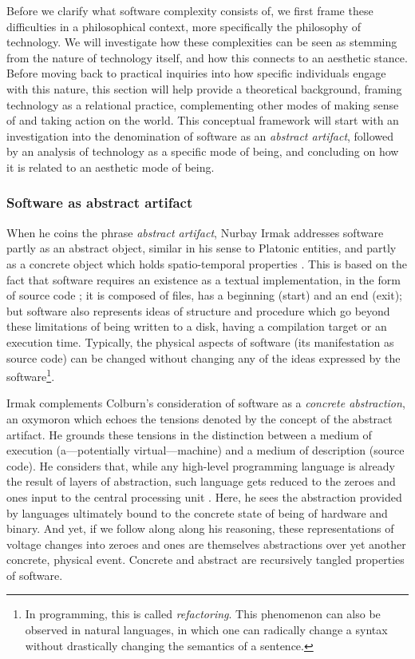 Before we clarify what software complexity consists of, we first frame these difficulties in a philosophical context, more specifically the philosophy of technology. We will investigate how these complexities can be seen as stemming from the nature of technology itself, and how this connects to an aesthetic stance. Before moving back to practical inquiries into how specific individuals engage with this nature, this section will help provide a theoretical background, framing technology as a relational practice, complementing other modes of making sense of and taking action on the world. This conceptual framework will start with an investigation into the denomination of software as an \emph{abstract artifact}, followed by an analysis of technology as a specific mode of being, and concluding on how it is related to an aesthetic mode of being.

\subsubsection{Software as abstract artifact}
\label{subsubsec:abstract-artifact}

When he coins the phrase \emph{abstract artifact}, Nurbay Irmak addresses software partly as an abstract object, similar in his sense to Platonic entities, and partly as a concrete object which holds spatio-temporal properties \citep{irmak_software_2012}. This is based on the fact that software requires an existence as a textual implementation, in the form of source code \citep{suber_what_1988}; it is composed of files, has a beginning (start) and an end (exit); but software also represents ideas of structure and procedure which go beyond these limitations of being written to a disk, having a compilation target or an execution time. Typically, the physical aspects of software (its manifestation as source code) can be changed without changing any of the ideas expressed by the software\footnote{In programming, this is called \emph{refactoring}. This phenomenon can also be observed in natural languages, in which one can radically change a syntax without drastically changing the semantics of a sentence.}.

Irmak complements Colburn's consideration of software as a \emph{concrete abstraction}, an oxymoron which echoes the tensions denoted by the concept of the abstract artifact. He grounds these tensions in the distinction between a medium of execution (a—potentially virtual—machine) and a medium of description (source code). He considers that, while any high-level programming language is already the result of layers of abstraction, such language gets reduced to the zeroes and ones input to the central processing unit \citep{colburn_philosophy_2000}. Here, he sees the abstraction provided by languages ultimately bound to the concrete state of being of hardware and binary. And yet, if we follow along along his reasoning, these representations of voltage changes into zeroes and ones are themselves abstractions over yet another concrete, physical event. Concrete and abstract are recursively tangled properties of software.

